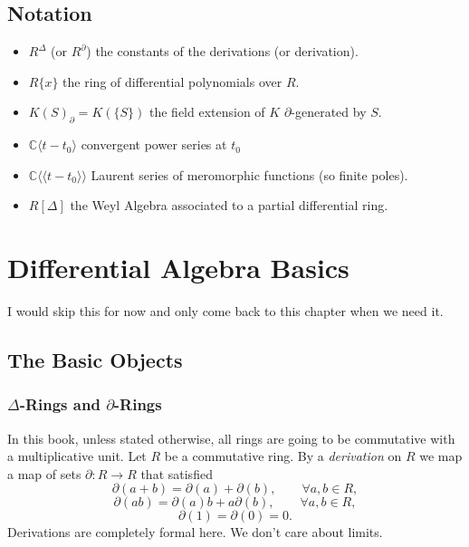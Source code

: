 \documentclass[12pt]{book}
\numberwithin{equation}{section}
\theoremstyle{definition}
\theoremstyle{remark}
\newcommand{\CC}{\mathbb{C}}
\newcommand{\llangle}{\langle \langle}
\newcommand{\rrangle}{\rangle \rangle}
\begin{document}
\newpage 
\section{Notation}
\begin{itemize}
	\item $R^{\Delta}$ (or $R^{\partial}$) the constants of the derivations (or derivation). 
	\item $R\lbrace x \rbrace$ the ring of differential polynomials over $R$.
	\item $K(S)_{\partial} = K(\lbrace S \rbrace)$ the field extension of $K$ $\partial$-generated by $S$.
	\item $\CC\langle t-t_0 \rangle$ convergent power series at $t_0$
	\item $\CC\llangle t-t_0\rrangle$ Laurent series of meromorphic functions (so finite poles).
	\item $R[\Delta]$ the Weyl Algebra associated to a partial differential ring.
\end{itemize}
\newpage

\mainmatter



\chapter{Differential Algebra Basics}
I would skip this for now and only come back to this chapter when we need it. 

\section{The Basic Objects}

\subsection{$\Delta$-Rings and $\partial$-Rings}
In this book, unless stated otherwise, all rings are going to be commutative with a multiplicative unit. 
Let $R$ be a commutative ring. 
By a \emph{derivation} on $R$ we map a map of sets $\partial:R\to R$ that satisfied 
 $$ \partial(a+b) = \partial(a) + \partial(b), \qquad \forall a,b\in R,$$
 $$ \partial(ab) = \partial(a) b + a\partial(b), \qquad \forall a, b \in R, $$
 $$ \partial(1) = \partial(0) = 0.$$
Derivations are completely formal here. 
We don't care about limits. 
\end{document}
